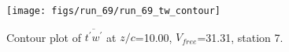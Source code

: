 \begin{figure}[H]
\centering
\texttt{[image: figs/run\_69/run\_69\_tw\_contour]}
\caption{Contour plot of $\overline{t^\prime w^\prime}$ at $z/c$=10.00, $V_{free}$=31.31, station 7.}
\end{figure}


